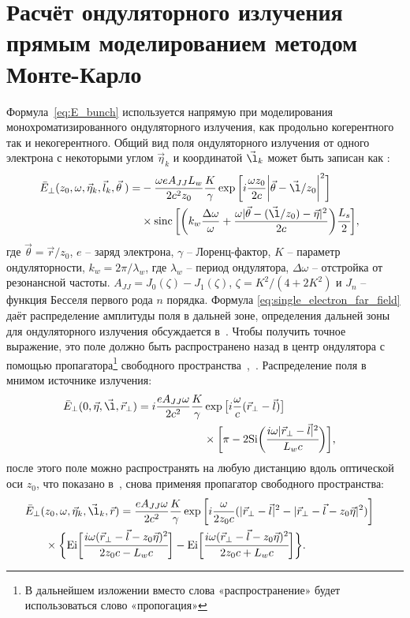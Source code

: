 \section{Расчёт ондуляторного излучения прямым моделированием методом Монте-Карло}
Формула~\ref{eq:E_bunch} используется напрямую при моделирования монохроматизированного ондуляторного излучения, как продольно когерентного так и некогерентного. Общий вид поля ондуляторного излучения от одного электрона с некоторыми углом $\vec{\eta}_k$ и координатой $\vec{\l}_k$ может быть записан как \cite{geloni_fourier_2007}: 
\begin{align}
	\bar{E}_{\bot}(z_0, \omega, \vec{\eta}_k, \vec{l}_k, \vec{\theta} \;) =
&	-\frac{\omega e A_{JJ} L_w}{2c^2z_0}\frac{K}{\gamma}\exp{\bigg[i \frac{\omega z_0}{2c} \bigg|\vec{\theta} - \vec{\l}/z_0\bigg|^2 \bigg]} \cr & \times \sinc \bigg[\bigg(k_w \frac{\Delta \omega}{\omega} + \frac{\omega |\vec{\theta} - (\vec{\l}/z_0) - \vec{\eta}|^2}{2c}\bigg)\cfrac{L_s}{2}\bigg],
	\label{eq:single_electron_far_field}
\end{align}
где $\vec{\theta} = \vec{r}/z_0$, $e$ -- заряд электрона, $\gamma$ -- Лоренц-фактор, $K$ -- параметр ондуляторности, $k_w = 2 \pi / \lambda_w$, где $\lambda_w$ -- период ондулятора, $\Delta \omega$ -- отстройка от резонансной частоты. $A_{JJ} = J_0(\zeta) - J_1(\zeta)$, $\zeta = K^2/(4 + 2K^2)$ и $J_n$ -- функция Бесселя первого рода $n$ порядка. Формула \ref{eq:single_electron_far_field} даёт распределение амплитуды поля в дальней зоне, определения дальней зоны для ондуляторного излучения обсуждается в~\cite{geloni_fourier_2007}. Чтобы получить точное выражение, это поле должно быть распространено назад в центр ондулятора с помощью пропагатора\footnote{В дальнейшем изложении вместо слова «распространение» будет использоваться слово «пропогация»} свободного пространства~\cite{voelz_computational_2011},~\cite{schmidt_numerical_2010}. Распределение поля в мнимом источнике излучения:
\begin{align}
	\bar{E}_{\bot}(0, \vec{\eta}, \vec{\l}, \vec{r}_{\bot}) =
	i \frac{e A_{JJ} \omega}{2 c^2}\frac{K}{\gamma} &\exp{\big[i \frac{\omega}{c} (\vec{r}_{\bot} - \vec{l})\big]}\cr & \times \bigg [\pi - 2\text{Si} \bigg( \cfrac{i \omega |\vec{r}_{\bot} - \vec{l}|^2}{L_w c}\bigg)\bigg], 
	\label{eq:single_electron_near_field_z=0}
\end{align}
после этого поле можно распространять на любую дистанцию вдоль оптической оси $z_0$, что показано в~\cite{geloni_fourier_2007}, снова применяя пропагатор свободного пространства:
\begin{align}
	\bar{E}_{\bot}(&z_0, \omega, \vec{\eta}_k, \vec{\l}_k, \vec{r}) =
		\frac{e A_{JJ} \omega}{2 c^2}\frac{K}{\gamma} \exp{\bigg[i \frac{\omega}{2 z_0 c} (|\vec{r}_{\bot} - \vec{l}|^2 - |\vec{r}_{\bot} - \vec{l} - z_0 \vec{\eta}|^2) \bigg]} \cr & \times	\bigg \{ \text{Ei} \bigg[ \cfrac{i \omega (\vec{r}_{\bot} - \vec{l} - z_0 \vec{\eta})^2}{2z_0c - L_w c}\bigg] - \text{Ei} \bigg[ \cfrac{i \omega (\vec{r}_{\bot} - \vec{l} - z_0 \vec{\eta})^2}{2z_0c + L_w c} \bigg] \bigg\}.
	\label{eq:single_electron_near_field}
\end{align}
